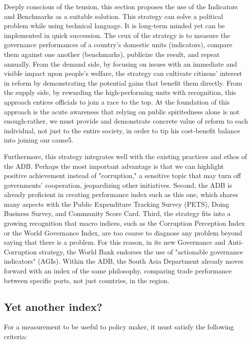 \documentclass[12pt]{article}
\begin{document}
Deeply conscious of the tension, this section proposes the use of the Indicators and Benchmarks as a suitable solution. This strategy can solve a political problem while using technical language. It is long-term minded yet can be implemented in quick succession. The crux of the strategy is to measure the governance performances of a country's domestic units (indicators), compare them against one another (benchmarks), publicize the result, and repeat annually. From the demand side, by focusing on issues with an immediate and visible impact upon people's welfare, the strategy can cultivate citizens' interest in reform by demonstrating the potential gains that benefit them directly. From the supply side, by rewarding the high-performing units with recognition, this approach entices officials to join a race to the top. At the foundation of this approach is the acute awareness that relying on public spiritedness alone is not enough-rather, we must provide and demonstrate concrete value of reform to each individual, not just to the entire society, in order to tip his cost-benefit balance into joining our cause5.

Furthermore, this strategy integrates well with the existing practices and ethos of the ADB. Perhaps the most important advantage is that we can highlight positive achievement instead of "corruption," a sensitive topic that may turn off governments' cooperation, jeopardizing other initiatives. Second, the ADB is already proficient in creating performance index such as this one, which shares many aspects with the Public Expenditure Tracking Survey (PETS), Doing Business Survey, and Community Score Card. Third, the strategy fits into a growing recognition that macro indices, such as the Corruption Perception Index or the World Governance Index, are too coarse to diagnose any problem beyond saying that there is a problem. For this reason, in its new Governance and Anti-Corruption strategy, the World Bank endorses the use of "actionable governance indicators" (AGIs). Within the ADB, the South Asia Department already moves forward with an index of the same philosophy, comparing trade performance between specific ports, not just countries, in the region.

\subsection{Yet another index?}
For a measurement to be useful to policy maker, it must satisfy the following criteria:
\bigskip
\end{document}
